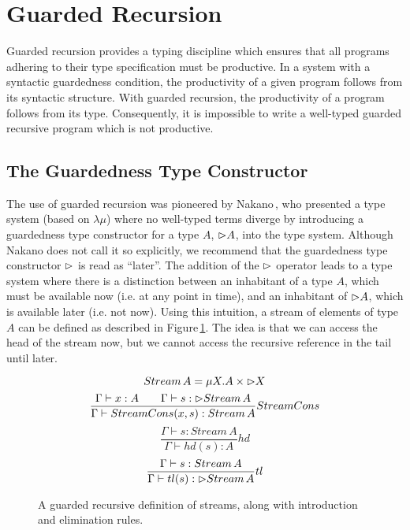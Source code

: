 
\section{Guarded Recursion}
\label{sec:guarded-recursion}

Guarded recursion provides a typing discipline which ensures that all programs adhering to their type specification must be productive. In a system with a syntactic guardedness condition, the productivity of a given program follows from its syntactic structure. With guarded recursion, the productivity of a program follows from its type. Consequently, it is impossible to write a well-typed guarded recursive program which is not productive.

\subsection{The Guardedness Type Constructor}
The use of guarded recursion was pioneered by Nakano\,\citep{Nakano:2000}, who presented a type system (based on $\lambda \mu$) where no well-typed terms diverge by introducing a guardedness type constructor for a type $A$, $\rhd A$, into the type system. Although Nakano does not call it so explicitly, we recommend that the guardedness type constructor $\rhd$ is read as ``later''. The addition of the $\rhd$ operator leads to a type system where there is a distinction between an inhabitant of a type $A$, which must be available now (i.e. at any point in time), and an inhabitant of $\rhd A$, which is available later (i.e. not now). Using this intuition, a stream of elements of type $A$ can be defined as described in Figure\,\ref{fig:guarded_recursion_stream}. The idea is that we can access the head of the stream now, but we cannot access the recursive reference in the tail until later.

\begin{figure}
\[
Stream\,A = \mu X. A \times \rhd X
\]
\[
\frac{\Gamma\vdash x : A \quad \quad \Gamma\vdash s : \rhd Stream\,A}{\Gamma\vdash StreamCons(x,s) : Stream\,A} StreamCons
\]
\[
\frac{\Gamma\vdash s : Stream\,A}{\Gamma\vdash hd(s) : A} hd
\]
\[
\frac{\Gamma\vdash s : Stream\,A}{\Gamma\vdash tl(s) : \rhd Stream\,A} tl
\]
\caption{A guarded recursive definition of streams, along with introduction and elimination rules.}
\label{fig:guarded_recursion_stream}
\end{figure} 

